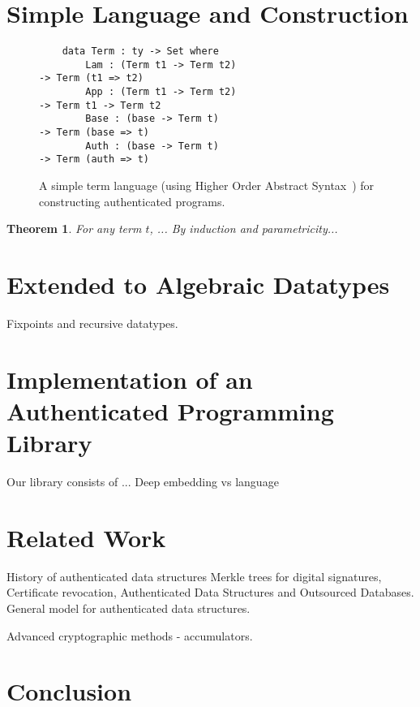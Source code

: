 \documentclass{acm_proc_article-sp}
\newtheorem{theorem}{Theorem}
\begin{document}
\section{Simple Language and Construction}

\begin{figure}
\begin{lstlisting}
    data Term : ty -> Set where
        Lam : (Term t1 -> Term t2)
-> Term (t1 => t2)
        App : (Term t1 -> Term t2) 
-> Term t1 -> Term t2
        Base : (base -> Term t) 
-> Term (base => t)
        Auth : (base -> Term t) 
-> Term (auth => t)
\end{lstlisting}
\caption{A simple term language (using Higher Order Abstract Syntax~\cite{Pfenning1988}) for constructing authenticated programs.}
\end{figure}




\begin{theorem}
For any term $t$, ...
\proof
By induction and parametricity...
\end{theorem}

\section{Extended to Algebraic Datatypes}

Fixpoints and recursive datatypes.

\section{Implementation of an Authenticated Programming Library}

Our library consists of ...
Deep embedding vs language

\section{Related Work}
History of authenticated data structures Merkle trees for digital signatures, Certificate revocation, Authenticated Data Structures and Outsourced Databases. General model for authenticated data structures.

Advanced cryptographic methods - accumulators.

\section{Conclusion}






\balancecolumns
\end{document}
